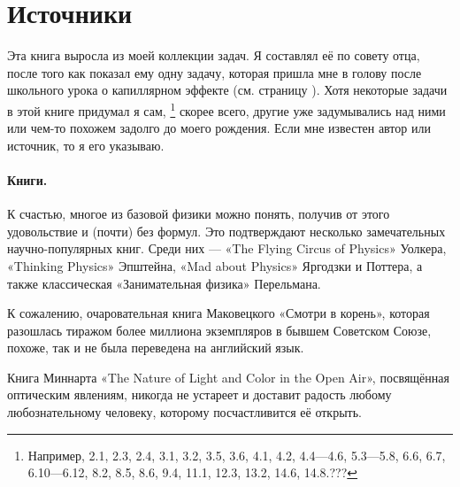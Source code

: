 \section{Источники}

Эта книга выросла из моей коллекции задач.
Я составлял её по совету отца, после того как показал ему одну задачу, которая пришла мне в голову после школьного урока о капиллярном эффекте (см. страницу \pageref{???}).
Хотя некоторые задачи в этой книге придумал я сам,%
\footnote{Например, 2.1, 2.3, 2.4, 3.1, 3.2, 3.5, 3.6, 4.1, 4.2, 4.4---4.6, 5.3---5.8, 6.6, 6.7,
6.10---6.12, 8.2, 8.5, 8.6, 9.4, 11.1, 12.3, 13.2, 14.6, 14.8.???}
скорее всего, другие уже задумывались над ними или чем-то похожем задолго до моего рождения.
Если мне известен автор или источник, то я его указываю.

\paragraph{Книги.}
К счастью, многое из базовой физики можно понять, получив от этого удовольствие и (почти) без формул.
Это подтверждают несколько замечательных научно-популярных книг.
Среди них — «The Flying Circus of Physics» Уолкера,
«Thinking Physics» Эпштейна,
«Mad about Physics» Яргодзки и Поттера,
а также классическая «Занимательная физика» Перельмана.

К сожалению, очаровательная книга Маковецкого «Смотри в корень», которая разошлась тиражом более миллиона экземпляров в бывшем Советском Союзе, похоже, так и не была переведена на английский язык.

Книга Миннарта «The Nature of Light and Color in the Open Air», посвящённая оптическим явлениям, никогда не устареет и доставит радость любому любознательному человеку, которому посчастливится её открыть.
